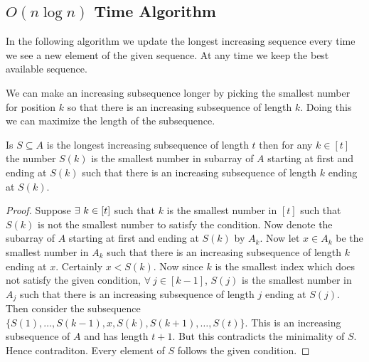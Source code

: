 \subsection{\texorpdfstring{$O(n\log n)$}{O(logn)} Time Algorithm}
In the following algorithm we update the longest increasing sequence every time we see a new element of the given sequence. At any time we keep the best available sequence.
\begin{idea*}
	We can make an increasing subsequence longer by picking the smallest number for position $k$ so that there is an increasing subsequence of length $k$. Doing this we can maximize the length of the subsequence. 
\end{idea*}

\begin{Theorem}{}{}
	Is $S\subseteq A$ is the longest increasing subsequence of length $t$ then for any $k\in[t]$ the number $S(k)$ is the smallest number in subarray of $A$ starting at first  and ending at $S(k)$ such that there is an increasing subsequence of length $k$ ending at $S(k)$.
\end{Theorem}
\begin{proof}
	Suppose $\exs\ k\in[t]$ such that $k$ is the smallest number in $[t]$ such that $S(k)$ is not the smallest number to satisfy the condition. Now denote the subarray of $A$ starting at first  and ending at $S(k)$ by $A_k$. Now let $x\in A_k$ be the smallest number in $A_k$ such that there is an increasing subsequence of length $k$ ending at $x$. Certainly $x<S(k)$. Now since $k$ is the smallest index which does not satisfy the given condition, $\forall\ j\in[k-1]$, $S(j)$ is the smallest number in $A_j$ such that there is an increasing subsequence of length $j$ ending at $S(j)$. Then consider the subsequence $\{S(1),\dots, S(k-1),x,S(k),S(k+1),\dots, S(t)\}$. This is an increasing subsequence of $A$ and has length $t+1$. But this contradicts the minimality of $S$. Hence contraditon. Every element of $S$ follows the given condition. 
\end{proof}

